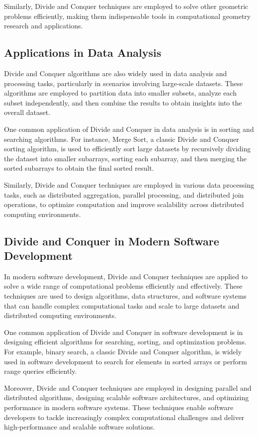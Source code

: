 \documentclass[12pt]{book} %
\begin{document}
Similarly, Divide and Conquer techniques are employed to solve other geometric problems efficiently, making them indispensable tools in computational geometry research and applications.

\subsection{Applications in Data Analysis}

Divide and Conquer algorithms are also widely used in data analysis and processing tasks, particularly in scenarios involving large-scale datasets. These algorithms are employed to partition data into smaller subsets, analyze each subset independently, and then combine the results to obtain insights into the overall dataset.

One common application of Divide and Conquer in data analysis is in sorting and searching algorithms. For instance, Merge Sort, a classic Divide and Conquer sorting algorithm, is used to efficiently sort large datasets by recursively dividing the dataset into smaller subarrays, sorting each subarray, and then merging the sorted subarrays to obtain the final sorted result.

Similarly, Divide and Conquer techniques are employed in various data processing tasks, such as distributed aggregation, parallel processing, and distributed join operations, to optimize computation and improve scalability across distributed computing environments.

\subsection{Divide and Conquer in Modern Software Development}

In modern software development, Divide and Conquer techniques are applied to solve a wide range of computational problems efficiently and effectively. These techniques are used to design algorithms, data structures, and software systems that can handle complex computational tasks and scale to large datasets and distributed computing environments.

One common application of Divide and Conquer in software development is in designing efficient algorithms for searching, sorting, and optimization problems. For example, binary search, a classic Divide and Conquer algorithm, is widely used in software development to search for elements in sorted arrays or perform range queries efficiently.

Moreover, Divide and Conquer techniques are employed in designing parallel and distributed algorithms, designing scalable software architectures, and optimizing performance in modern software systems. These techniques enable software developers to tackle increasingly complex computational challenges and deliver high-performance and scalable software solutions.
\end{document}
